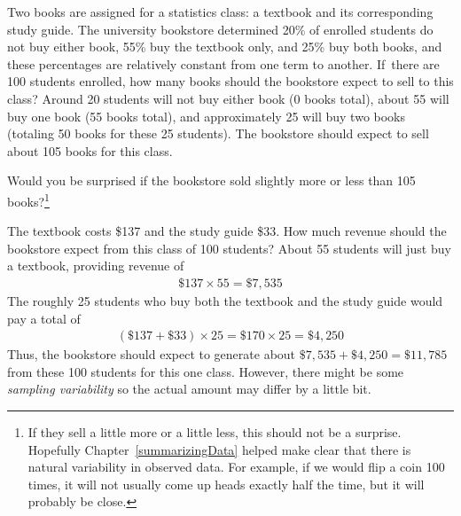 
\begin{example}{Two books are assigned for a statistics class: a textbook and its corresponding study guide. The university bookstore determined 20\% of enrolled students do not buy either book, 55\% buy the textbook only, and 25\% buy both books, and these percentages are relatively constant from one term to another. If~there are 100 students enrolled, how many books should the bookstore expect to sell to this class?}\label{bookStoreSales}
Around 20 students will not buy either book (0 books total), about 55 will buy one book (55 books total), and approximately 25 will buy two books (totaling 50 books for these 25 students). The bookstore should expect to sell about 105 books for this class.
\end{example}

\begin{exercise}
Would you be surprised if the bookstore sold slightly more or less than 105 books?\footnote{If they sell a little more or a little less, this should not be a surprise. Hopefully Chapter~\ref{summarizingData} helped make clear that there is natural variability in observed data. For example, if we would flip a coin 100 times, it will not usually come up heads exactly half the time, but it will probably be close.}
\end{exercise}

\begin{example}{The textbook costs \$137 and the study guide \$33. How much revenue should the bookstore expect from this class of 100 students?}\label{bookStoreRev}
About 55 students will just buy a textbook, providing revenue of
\begin{eqnarray*}
\$137 \times  55 = \$7,535
\end{eqnarray*}
The roughly 25 students who buy both the textbook and the study guide would pay a total of
\begin{eqnarray*}
(\$137 + \$33) \times  25 = \$170 \times  25 = \$4,250
\end{eqnarray*}
Thus, the bookstore should expect to generate about $\$7,535 + \$4,250 = \$11,785$ from these 100 students for this one class. However, there might be some \emph{sampling variability} so the actual amount may differ by a little bit.
\end{example}

